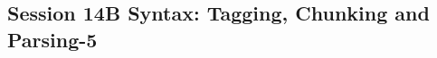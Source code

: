 \subsection{\large Session 14B Syntax: Tagging, Chunking and Parsing-5}
\label{parallel-session-14B-trackG}
\TrackGLoc\hfill\sessionchair{}{}
\clearpage


